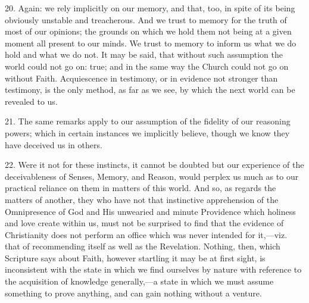 20. Again: we rely implicitly on our memory, and that, too, in
spite of its being obviously unstable and treacherous. And we trust to
memory for the truth of most of our opinions; the grounds on which we
hold them not being at a given moment all present to our minds. We
trust to memory to inform us what we do hold and what we do not. It
may be said, that without such assumption the world could not go on:
true; and in the same way the Church could not go on without Faith.
Acquiescence in testimony, or in evidence not stronger than testimony,
is the only method, as far as we see, by which the next world can be
revealed to us.

21. The same remarks apply to our assumption of the fidelity of our
reasoning powers; which in certain instances we implicitly believe,
though we know they have deceived us in others.

22. Were it not for these instincts, it cannot be doubted but our
experience of the deceivableness of Senses, Memory, and Reason, would
perplex us much as to our practical reliance on them in matters of
this world. And so, as regards the matters of another, they who have
not that instinctive apprehension of the Omnipresence of God and His
unwearied and minute Providence which holiness and love create within
us, must not be surprised to find that the evidence of Christianity
does not perform an office which was never intended for it,—viz.
that of recommending itself as well as the Revelation. Nothing, then,
which Scripture says about Faith, however startling it may be at first
sight, is inconsistent with the state in which we find ourselves by
nature with reference to the acquisition of knowledge generally,—a
state in which we must assume something to prove anything, and can
gain nothing without a venture.

